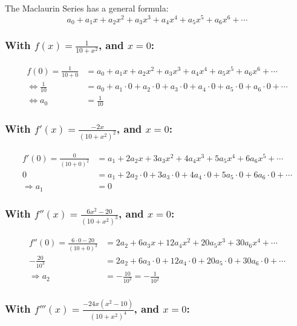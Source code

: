 \documentclass[12pt]{article}
\begin{document}
\noindent The Maclaurin Series has a general formula:
$$a_0+ a_1x+ a_2x^2+ a_3x^3+ a_4x^4+ a_5x^5+ a_6x^6+ \cdots$$


\subsubsection*{With $\displaystyle f(x)=\frac{1}{10+x^2}$, and $x=0$:}

\begin{align*}
    f(0)=\frac{1}{10+0} &= a_0+ a_1x+ a_2x^2+ a_3x^3+ a_4x^4+ a_5x^5+ a_6x^6+ \cdots\\
    \Longleftrightarrow
    \frac{1}{10} &= a_0+ a_1\cdot 0+ a_2\cdot 0+ a_3\cdot 0+ a_4\cdot 0+ a_5\cdot 0+ a_6\cdot 0+ \cdots\\
    \Longleftrightarrow a_0 &= \frac{1}{10}
\end{align*}


\subsubsection*{With $\displaystyle f'(x)= \frac{-2x}{\left(10+x^2 \right)^2}$, and $x=0$:}
\begin{align*}
    f'(0)=\frac{0}{\left(10+0\right)^2} &= a_1+ 2a_2x+ 3a_3x^2+ 4a_4x^3+ 5a_5x^4+ 6a_6x^5+ \cdots\\
    0 &= a_1+ 2a_2\cdot 0+ 3a_3\cdot 0+ 4a_4\cdot 0+ 5a_5\cdot 0+ 6a_6\cdot 0+ \cdots\\
    \Longrightarrow a_1 &= 0
\end{align*}



\subsubsection*{With $\displaystyle f''(x)= \frac{6x^2- 20}{\left(10+x^2 \right)^3}$, and $x=0$:}

\begin{align*}
    f''(0)= \frac{6\cdot 0- 20}{\left(10+ 0 \right)^3}
    &= 2a_2+ 6a_3x+ 12a_4x^2+ 20a_5x^3+ 30a_6x^4+ \cdots\\
    - \frac{20}{10^3} &= 2a_2+ 6a_3\cdot 0+ 12a_4\cdot 0+ 20a_5\cdot 0+ 30a_6\cdot 0+ \cdots\\
    \Longrightarrow a_2 &=- \frac{10}{10^3}=- \frac{1}{10^2}
\end{align*}



\subsubsection*{With $\displaystyle f'''(x)= \frac{-24x\left(x^2-10 \right)}{\left(10+x^2 \right)^4}$, and $x=0$:}
\end{document}
